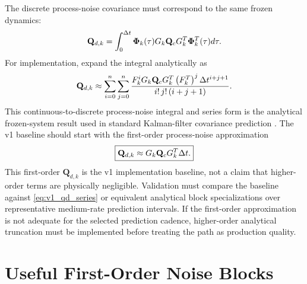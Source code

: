 The discrete process-noise covariance must correspond to the same frozen
dynamics:
\begin{equation}
\mathbf{Q}_{d,k}
=
\int_0^{\Delta t}
\boldsymbol{\Phi}_k(\tau)G_k\mathbf{Q}_c G_k^T\boldsymbol{\Phi}_k^T(\tau)d\tau.
\label{eq:v1_qd_integral}
\end{equation}
For implementation, expand the integral analytically as
\begin{equation}
\mathbf{Q}_{d,k}
\approx
\sum_{i=0}^{n}
\sum_{j=0}^{n}
\frac{
F_k^i
G_k\mathbf{Q}_c G_k^T
\left(F_k^T\right)^j
\Delta t^{i+j+1}
}{
i!\,j!\,(i+j+1)
}.
\label{eq:v1_qd_series}
\end{equation}
This continuous-to-discrete process-noise integral and series form is the
analytical frozen-system result used in standard Kalman-filter covariance
prediction \cite{simon2006,brown2012,palumbo2010}. The v1 baseline should start
with the first-order process-noise approximation
\begin{equation}
\boxed{
\mathbf{Q}_{d,k}
\approx
G_k\mathbf{Q}_c G_k^T\Delta t.
}
\label{eq:v1_qd_first_order}
\end{equation}
This first-order $\mathbf{Q}_{d,k}$ is the v1 implementation baseline, not a
claim that higher-order terms are physically negligible. Validation must compare
the baseline against \cref{eq:v1_qd_series} or equivalent analytical block
specializations over representative medium-rate prediction intervals. If the
first-order approximation is not adequate for the selected prediction cadence,
higher-order analytical truncation must be implemented before treating the path
as production quality.

\section{Useful First-Order Noise Blocks}


